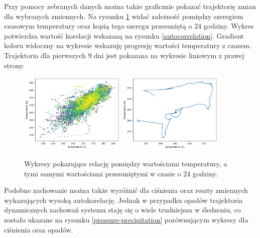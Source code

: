 Przy pomocy zebranych danych można także graficznie pokazać trajektorię zmian dla wybranych zmiennych. Na rysunku \ref{temperature} widać zależność pomiędzy szeregiem czasowym temperatury
oraz kopią tego szeregu przesuniętą o 24 godziny. Wykres potwierdza wartość korelacji 
wskazaną na rysunku \ref{autocorrelation}. Gradient koloru widoczny na wykresie wskazuję
progresję wartości temperatury z czasem. Trajektoria dla pierwszych 9 dni jest pokazana 
na wykresie liniowym z prawej strony. 

\begin{figure}[H]
    \centering
    \includegraphics[width=0.45\textwidth]{images/temperature_scatter.png}
    \includegraphics[width=0.45\textwidth]{images/temperature_line.png}
    \caption{Wykresy pokazujące relację pomiędzy wartościami temperatury, a tymi samymi 
    wartościami przesuniętymi w czasie o 24 godziny.}
    \label{temperature}
\end{figure}

Podobne zachowanie można także wyróżnić dla ciśnienia oraz reszty zmiennych wykazujących 
wysoką autokorelację. Jednak w przypadku opadów trajektoria dynamicznych zachowań systemu
staję się o wiele trudniejsza w śledzeniu, co zostało ukazane na rysunku \ref{pressure-precipitation} porównującym wykresy dla ciśnienia oraz opadów. 


